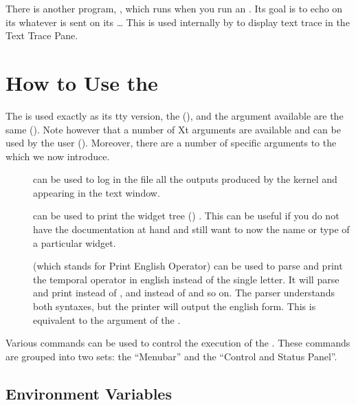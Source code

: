 There is another program, , which runs when you run
an \XPK{}. Its goal is to echo on its  whatever is sent on
its \dots{} This is used internally by \XOPRS{} to display text
trace in the Text Trace Pane. 

\chapter{How to Use the \XPK{}}

The \XPK{} is used exactly as its tty version, the \CPK{} (), and the argument available are the same (). Note however that a number of Xt arguments are available
and can be used by the user (). Moreover,
there are a number of specific arguments to the \XPK{} which we now introduce.

\begin{description}

\item[] can be used to log in the file  all
the outputs produced by the kernel and appearing in the text window.

\item[] can be used to print the \XPK{} widget tree () . This can be useful if you do not have the
documentation at hand and still want to now the name or type of a particular
widget.


\item[] (which stands for Print English Operator) can be used to
parse and print the temporal operator in english instead of the single letter. It will
parse and print  instead of \samp{!}, and  instead of \samp{\^{}}
and so on. The parser understands both syntaxes, but the printer will output the english form.
This is equivalent to the  argument of the \CPK{}.

\end{description}

Various commands can be used to control the execution of the \XPK{}.
These commands are grouped into two sets: the ``Menubar'' and the ``Control
and Status Panel''.



\section{\XPK{} Environment Variables}

